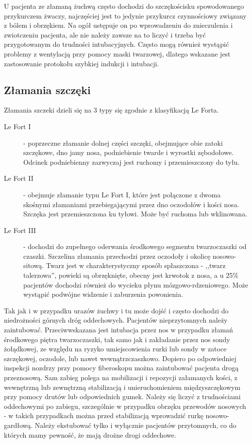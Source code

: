 \documentclass[a4paper, 12pt]{report}
\begin{document}
U pacjenta ze złamaną żuchwą często dochodzi do szczękościsku
spowodowanego przykurczem żwaczy, najczęściej jest to jedynie
przykurcz czynnościowy związany z bólem i obrzękiem. Na ogół ustępuje
on po wprowadzeniu do znieczulenia i zwiotczeniu pacjenta, ale nie
należy zawsze na to liczyć i trzeba być przygotowanym do trudności
intubacyjnych. Często mogą również wystąpić problemy z wentylacją przy
pomocy maski twarzowej, dlatego wskazane jest zastosowanie protokołu
szybkiej indukcji i intubacji.

\subsection{Złamania szczęki}

Złamania szczeki dzieli się na 3 typy się zgodnie z klasyfikacją Le
Forta.
\begin{description}
\item [Le Fort I] - poprzeczne złamanie dolnej części szczęki,
  obejmujące obie zatoki szczękowe, dno jamy nosa, podniebienie twarde
  i wyrostki zębodołowe. Odcinek podniebienny zazwyczaj jest ruchomy i
  przemieszczony do tyłu.
\item [Le Fort II] - obejmuje złamanie typu Le Fort I, które jest
  połączone z dwoma skośnymi złamaniami przebiegającymi przez dno
  oczodołów i kości nosa. Szczęka jest przemieszczona ku tyłowi. Może
  być ruchoma lub wklinowana.
\item [Le Fort III] - dochodzi do zupełnego oderwania środkowego
  segmentu twarzoczaszki od czaszki. Szczelina złamania przechodzi
  przez oczodoły i okolicę nosowo-sitową. Twarz jest w
  charakterystyczny sposób spłaszczona - ,,twarz talerzowa'', powieki
  są obrzęknięte, obecny jest krwotok z nosa, a u 25\% pacjentów
  dochodzi również do wycieku płynu mózgowo-rdzeniowego. Może wystąpić
  podwójne widzenie i zaburzenia powonienia.
\end{description}

Tak jak i w przypadku urazów żuchwy i tu może dojść i często dochodzi
do niedrożności górnych dróg oddechowych. Pacjentów nieprzytomnych
należy zaintubować. Przeciwwskazana jest intubacja przez nos w
przypadku złamań środkowego piętra twarzoczaszki, tak samo jak i
zakładanie przez nos sondy żołądkowej, ze względu na ryzyko
umiejscowienia rurki lub sondy w zatoce szczękowej, oczodole, lub
nawet wewnątrzczaszkowo. Dopiero po odpowiedniej inspekcji nozdrzy
przy pomocy fiberoskopu można zaintubować pacjenta drogą przeznosową.
Sam zabieg polega na mobilizacji i repozycji załamanych kości, z
wewnętrzną lub zewnętrzną stabilizacją i unieruchomieniem
międzyszczękowym przy pomocy drutów lub odpowiednich gumek. Należy się
liczyć z trudnościami oddechowymi po zabiegu, szczególnie w przypadku
obrzęku przewodów nosowych - w takich przypadkach można przed
stabilizacją wprowadzić rurkę nosowo-gardłową. Należy ekstubować tylko
i wyłącznie pacjentów przytomnych, co do których mamy pewność, że mają
drożne drogi oddechowe.
\end{document}
